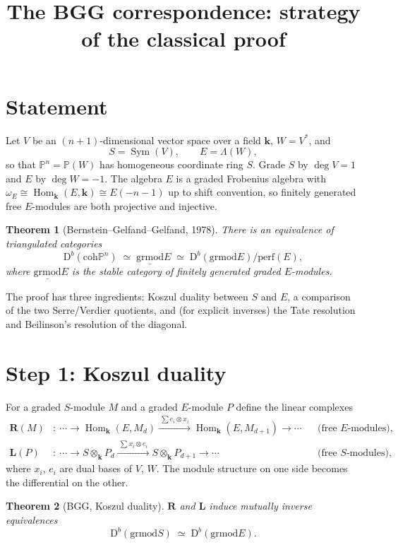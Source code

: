\documentclass[11pt]{article}
\title{The BGG correspondence: strategy of the classical proof}
\author{}
\date{}
\newtheorem{theorem}{Theorem}
\theoremstyle{remark}
\newcommand{\PP}{\mathbb{P}}
\newcommand{\Dcal}{\mathrm{D}}
\newcommand{\coh}{\mathrm{coh}}
\newcommand{\grmod}{\mathrm{grmod}}
\newcommand{\stgrmod}{\underline{\mathrm{grmod}}}
\newcommand{\perf}{\mathrm{perf}}
\newcommand{\Hom}{\operatorname{Hom}}
\newcommand{\Sym}{\operatorname{Sym}}
\renewcommand{\k}{\mathbf{k}}
\begin{document}
\maketitle

\section{Statement}

Let $V$ be an $(n+1)$-dimensional vector space over a field $\k$, $W=V^*$, and
\[
S=\Sym(V),\qquad E=\Lambda(W),
\]
so that $\PP^n=\PP(W)$ has homogeneous coordinate ring $S$. Grade $S$ by $\deg V=1$ and $E$ by $\deg W=-1$. The algebra $E$ is a graded Frobenius algebra with $\omega_E\cong\Hom_\k(E,\k)\cong E(-n-1)$ up to shift convention, so finitely generated free $E$-modules are both projective and injective.

\begin{theorem}[Bernstein--Gelfand--Gelfand, 1978]
There is an equivalence of triangulated categories
\[
\Dcal^b(\coh \PP^n)\;\simeq\;\stgrmod E\;\simeq\;\Dcal^b(\grmod E)/\perf(E),
\]
where $\stgrmod E$ is the stable category of finitely generated graded $E$-modules.
\end{theorem}

The proof has three ingredients: Koszul duality between $S$ and $E$, a comparison of the two Serre/Verdier quotients, and (for explicit inverses) the Tate resolution and Beilinson's resolution of the diagonal.

\section{Step 1: Koszul duality}

For a graded $S$-module $M$ and a graded $E$-module $P$ define the linear complexes
\begin{align*}
\mathbf{R}(M)&:\ \cdots\to \Hom_\k(E,M_d)\xrightarrow{\ \sum e_i\otimes x_i\ }\Hom_\k(E,M_{d+1})\to\cdots &&\text{(free $E$-modules)},\\
\mathbf{L}(P)&:\ \cdots\to S\otimes_\k P_d\xrightarrow{\ \sum x_i\otimes e_i\ }S\otimes_\k P_{d+1}\to\cdots &&\text{(free $S$-modules)},
\end{align*}
where $x_i$, $e_i$ are dual bases of $V$, $W$. The module structure on one side becomes the differential on the other.

\begin{theorem}[BGG, Koszul duality]
$\mathbf{R}$ and $\mathbf{L}$ induce mutually inverse equivalences
\[
\Dcal^b(\grmod S)\;\simeq\;\Dcal^b(\grmod E).
\]
\end{theorem}
\end{document}
